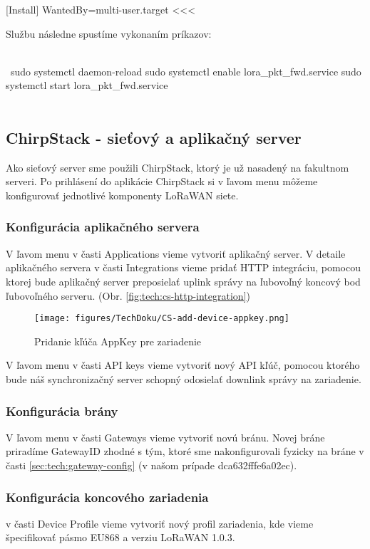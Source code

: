 [Install]
WantedBy=multi-user.target
<<<

Službu následne spustíme vykonaním príkazov:

\\\
sudo systemctl daemon-reload
sudo systemctl enable lora_pkt_fwd.service
sudo systemctl start lora_pkt_fwd.service
\\\




\subsection{ChirpStack - sieťový a aplikačný server}

Ako sieťový server sme použili ChirpStack, ktorý je už nasadený na fakultnom serveri. Po prihlásení do aplikácie ChirpStack si v ľavom menu môžeme konfigurovať jednotlivé komponenty LoRaWAN siete.


\subsubsection{Konfigurácia aplikačného servera}

V ľavom  menu v časti Applications vieme vytvoriť aplikačný server. 
V detaile aplikačného servera v časti Integrations vieme pridať HTTP integráciu, pomocou ktorej bude aplikačný server preposielať uplink správy na ľubovoľný koncový bod ľubovoľného serveru. (Obr. \ref{fig:tech:cs-http-integration})

\begin{figure}[!h]
    \centering
    \texttt{[image: figures/TechDoku/CS-add-device-appkey.png]}
    \caption{Pridanie kľúča AppKey pre zariadenie}
    \label{fig:tech:cs-device-appkey}
\end{figure}

V ľavom menu v časti API keys vieme vytvoriť nový API kľúč, pomocou ktorého bude náš synchronizačný server schopný odosielať downlink správy na zariadenie.


\subsubsection{Konfigurácia brány}

V ľavom menu v časti Gateways vieme vytvoriť novú bránu. Novej bráne priradíme GatewayID zhodné s tým, ktoré sme nakonfigurovali fyzicky na bráne v časti \ref{sec:tech:gateway-config} (v našom prípade dca632fffe6a02ec).

\subsubsection{Konfigurácia koncového zariadenia}
v časti Device Profile vieme vytvoriť nový profil zariadenia, kde vieme špecifikovať pásmo EU868 a verziu LoRaWAN 1.0.3.

